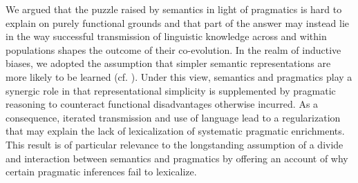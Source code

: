 \documentclass[a4paper]{article}
\begin{document}
We argued that the puzzle raised by semantics in light of pragmatics is hard to explain on purely functional grounds and that part of the answer may instead lie in the way successful transmission of linguistic knowledge across and within populations shapes the outcome of their co-evolution. In the realm of inductive biases, we adopted the assumption that simpler semantic representations are more likely to be learned (cf. \citealt{chater+vitanyi:2003}). Under this view, semantics and pragmatics play a synergic role in that representational simplicity is supplemented by pragmatic reasoning to counteract functional disadvantages otherwise incurred. As a consequence, iterated transmission and use of language lead to a regularization that may explain the lack of lexicalization of systematic pragmatic enrichments. This result is of particular relevance to the longstanding assumption of a divide and interaction between semantics and pragmatics by offering an account of why certain pragmatic inferences fail to lexicalize. 
\end{document}
